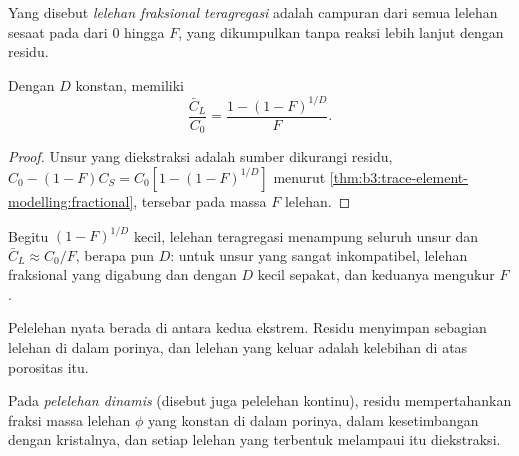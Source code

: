 \begin{omfigure}
\par{}\label{fig:b3:trace-element-modelling:curves}
\end{omfigure}

\begin{definition}\label{def:b3:trace-element-modelling:fractional}
Yang disebut \emph{lelehan fraksional teragregasi} adalah
campuran dari semua lelehan sesaat pada  dari $0$ hingga
$F$, yang dikumpulkan tanpa reaksi lebih lanjut dengan residu.
\end{definition}

\begin{proposition}
\label{prop:b3:trace-element-modelling:aggregate}
Dengan $D$ konstan,  memiliki
\[
\frac{\bar C_L}{C_0} = \frac{1 - (1 - F)^{1/D}}{F}.
\]
\end{proposition}

\begin{proof}
Unsur yang diekstraksi adalah sumber dikurangi residu,
$C_0 - (1 - F)C_S = C_0[1 - (1 - F)^{1/D}]$ menurut \cref{thm:b3:trace-element-modelling:fractional},
tersebar pada massa $F$ lelehan.
\end{proof}

Begitu $(1 - F)^{1/D}$ kecil, lelehan teragregasi menampung seluruh
unsur dan $\bar C_L \approx C_0/F$, berapa pun $D$: untuk unsur yang sangat
inkompatibel, lelehan fraksional yang digabung dan  dengan $D$ kecil sepakat, dan
keduanya mengukur $F$.

Pelelehan nyata berada di antara kedua ekstrem. Residu menyimpan sebagian lelehan di dalam
porinya, dan lelehan yang keluar adalah kelebihan di atas porositas itu.

\begin{definition}\label{def:b3:trace-element-modelling:dynamic}
Pada \emph{pelelehan dinamis} (disebut juga pelelehan
kontinu), residu mempertahankan fraksi massa lelehan $\phi$ yang konstan di dalam
porinya, dalam kesetimbangan dengan kristalnya, dan setiap lelehan yang terbentuk melampaui itu
diekstraksi.
\end{definition}

